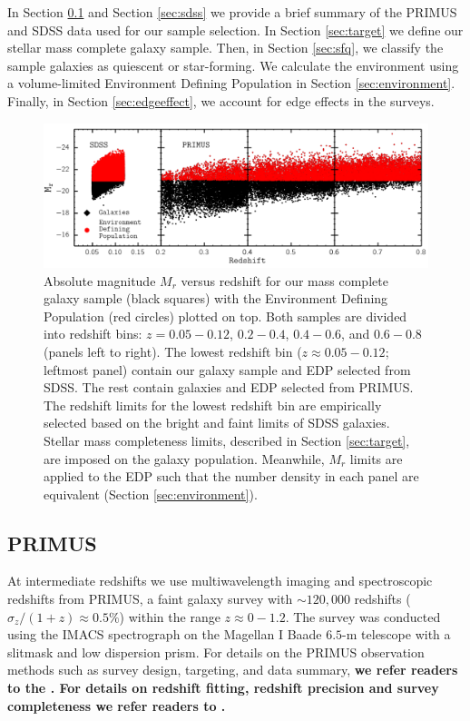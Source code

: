 \documentclass{emulateapj}
\begin{document}
In Section \ref{sec:primus} and Section \ref{sec:sdss} we provide a
brief summary of the PRIMUS and SDSS data used for our sample
selection. In Section \ref{sec:target} we define our stellar mass complete galaxy sample.  
Then, in Section \ref{sec:sfq}, we classify the sample galaxies as quiescent or star-forming. 
We calculate the environment
using a volume-limited Environment Defining Population in Section
\ref{sec:environment}.  Finally, in Section \ref{sec:edgeeffect}, we
account for edge effects in the surveys.

\begin{figure}
    \begin{center}
        \leavevmode
	\includegraphics[scale=0.475]{fig1.pdf}
        \caption{Absolute magnitude $M_{r}$ versus redshift for our mass complete galaxy sample (black squares) with the Environment Defining Population (red circles) plotted on top. Both samples are divided into redshift bins: $z = 0.05-0.12$, $0.2-0.4$, $0.4-0.6$, and $0.6-0.8$ (panels left to right). The lowest redshift bin ($z \approx 0.05-0.12$; leftmost panel) contain our galaxy sample and EDP selected from SDSS. The rest contain galaxies and EDP selected from PRIMUS. The redshift limits for the lowest redshift bin are empirically selected based on the bright and faint limits of SDSS galaxies. Stellar mass completeness limits, described in Section \ref{sec:target}, are imposed on the galaxy population. Meanwhile, $M_{r}$ limits are applied to the EDP such that the number density in each panel are equivalent (Section \ref{sec:environment}).} \label{fig:targetEDP}
    \end{center}
\end{figure}
\subsection{PRIMUS} \label{sec:primus}
At intermediate redshifts we use multiwavelength imaging and
spectroscopic redshifts from PRIMUS, a faint galaxy survey with $\sim
120,000$ redshifts ($\sigma_z/(1+z) \approx 0.5 \%$) within the range
$z \approx 0-1.2$. The survey was conducted using the IMACS
spectrograph on the Magellan I Baade $6.5$-m telescope with a slitmask and low dispersion prism. For details on the PRIMUS observation methods such as survey design, targeting, and data summary, {\bf we refer readers to the \cite{Coil:2011aa}. For details on redshift fitting, redshift precision and survey completeness we refer readers to \cite{Cool:2013aa}.}
\end{document}

